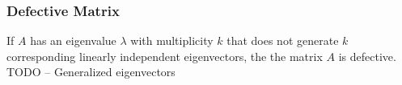 \subsubsection{Defective Matrix}
If $A$ has an eigenvalue $\lambda$ with multiplicity $k$ that does not generate $k$ corresponding linearly independent eigenvectors, the the matrix $A$ is defective.
TODO -- Generalized eigenvectors